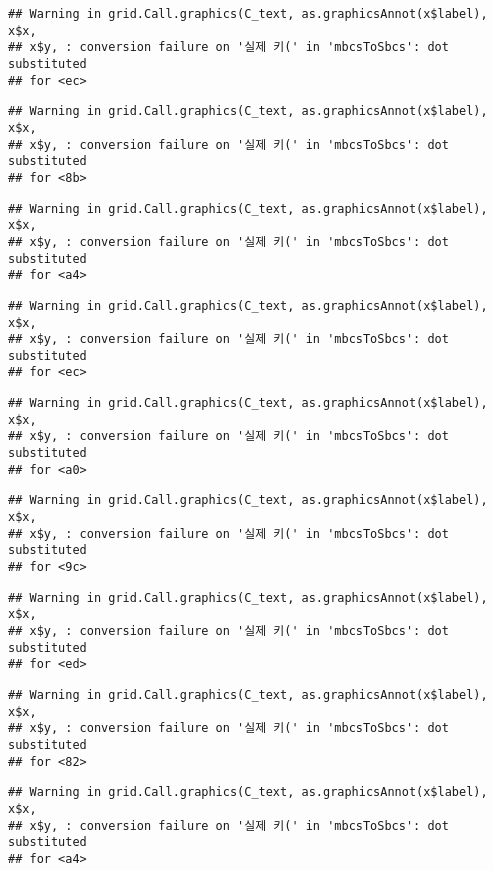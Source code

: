 \documentclass[]{book}
\begin{document}
\begin{verbatim}
## Warning in grid.Call.graphics(C_text, as.graphicsAnnot(x$label), x$x,
## x$y, : conversion failure on '실제 키(' in 'mbcsToSbcs': dot substituted
## for <ec>
\end{verbatim}

\begin{verbatim}
## Warning in grid.Call.graphics(C_text, as.graphicsAnnot(x$label), x$x,
## x$y, : conversion failure on '실제 키(' in 'mbcsToSbcs': dot substituted
## for <8b>
\end{verbatim}

\begin{verbatim}
## Warning in grid.Call.graphics(C_text, as.graphicsAnnot(x$label), x$x,
## x$y, : conversion failure on '실제 키(' in 'mbcsToSbcs': dot substituted
## for <a4>
\end{verbatim}

\begin{verbatim}
## Warning in grid.Call.graphics(C_text, as.graphicsAnnot(x$label), x$x,
## x$y, : conversion failure on '실제 키(' in 'mbcsToSbcs': dot substituted
## for <ec>
\end{verbatim}

\begin{verbatim}
## Warning in grid.Call.graphics(C_text, as.graphicsAnnot(x$label), x$x,
## x$y, : conversion failure on '실제 키(' in 'mbcsToSbcs': dot substituted
## for <a0>
\end{verbatim}

\begin{verbatim}
## Warning in grid.Call.graphics(C_text, as.graphicsAnnot(x$label), x$x,
## x$y, : conversion failure on '실제 키(' in 'mbcsToSbcs': dot substituted
## for <9c>
\end{verbatim}

\begin{verbatim}
## Warning in grid.Call.graphics(C_text, as.graphicsAnnot(x$label), x$x,
## x$y, : conversion failure on '실제 키(' in 'mbcsToSbcs': dot substituted
## for <ed>
\end{verbatim}

\begin{verbatim}
## Warning in grid.Call.graphics(C_text, as.graphicsAnnot(x$label), x$x,
## x$y, : conversion failure on '실제 키(' in 'mbcsToSbcs': dot substituted
## for <82>
\end{verbatim}

\begin{verbatim}
## Warning in grid.Call.graphics(C_text, as.graphicsAnnot(x$label), x$x,
## x$y, : conversion failure on '실제 키(' in 'mbcsToSbcs': dot substituted
## for <a4>
\end{verbatim}
\end{document}

